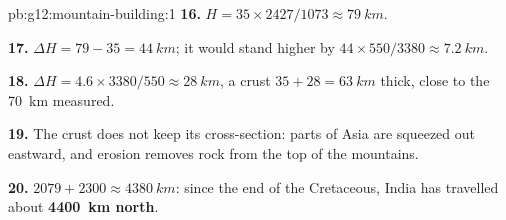 \begin{solution}{pb:g12:mountain-building:1}
\textbf{16.} $H = 35 \times 2427/1073 \approx \qty{79}{km}$.

\textbf{17.} $\Delta H = 79 - 35 = \qty{44}{km}$; it would stand higher by
$44 \times 550/3380 \approx \qty{7.2}{km}$.

\textbf{18.} $\Delta H = 4.6 \times 3380/550 \approx \qty{28}{km}$, a crust
$35 + 28 = \qty{63}{km}$ thick, close to the \qty{70}{km}
measured.

\textbf{19.} The crust does not keep its cross-section: parts of Asia are
squeezed out eastward, and erosion removes rock from the top of the
mountains.

\textbf{20.} $2079 + 2300 \approx \qty{4380}{km}$: since the end of the
Cretaceous, India has travelled about \textbf{\qty{4400}{km} north}.
\end{solution}
